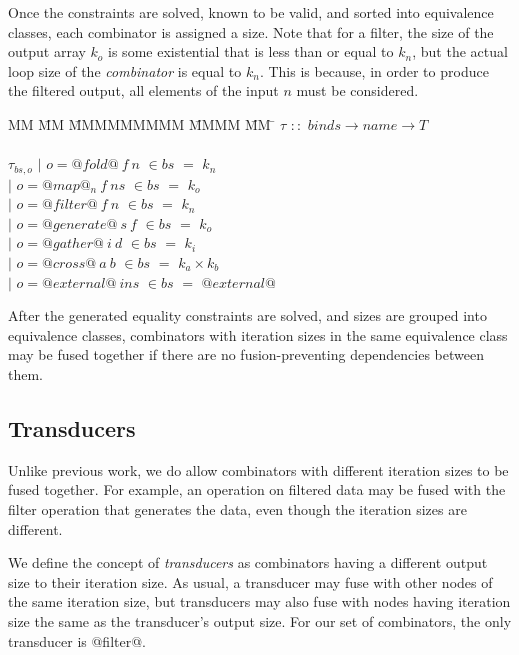Once the constraints are solved, known to be valid, and sorted into equivalence classes, each combinator is assigned a size.
Note that for a filter, the size of the output array $k_o$ is some existential that is less than or equal to $k_n$, but the actual loop size of the \emph{combinator} is equal to $k_n$.
This is because, in order to produce the filtered output, all elements of the input $n$ must be considered.


\begin{tabbing}
MM \= MM \= MMMMMMMMM \= MMMM \= MM \= \kill
$\tau$  \>$::$\> $binds \rightarrow name \rightarrow T$ \\
\\
$\tau_{bs,o}$    
            \> $|$ \> $o = @fold@~f~n$      \> $\in bs$ \> $=$ \> $k_n$ \\
            \> $|$ \> $o = @map@_n~f~ns$    \> $\in bs$ \> $=$ \> $k_o$ \\
            \> $|$ \> $o = @filter@~f~n$    \> $\in bs$ \> $=$ \> $k_n$ \\
            \> $|$ \> $o = @generate@~s~f$  \> $\in bs$ \> $=$ \> $k_o$ \\
            \> $|$ \> $o = @gather@~i~d$    \> $\in bs$ \> $=$ \> $k_i$ \\
            \> $|$ \> $o = @cross@~a~b$     \> $\in bs$ \> $=$ \> $k_a \times k_b$ \\
            \> $|$ \> $o = @external@~ins$  \> $\in bs$ \> $=$ \> $@external@$ \\
\end{tabbing}

After the generated equality constraints are solved, and sizes are grouped into equivalence classes, combinators with iteration sizes in the same equivalence class may be fused together if there are no fusion-preventing dependencies between them.


\subsection{Transducers}
Unlike previous work, we do allow combinators with different iteration sizes to be fused together.
For example, an operation on filtered data may be fused with the filter operation that generates the data, even though the iteration sizes are different.

We define the concept of \emph{transducers} as combinators having a different output size to their iteration size.
As usual, a transducer may fuse with other nodes of the same iteration size, but transducers may also fuse with nodes having iteration size the same as the transducer's output size.
For our set of combinators, the only transducer is @filter@.


